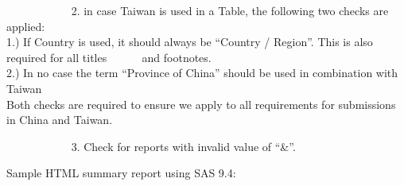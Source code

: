 \documentclass[
  letterpaper,
  DIV=11,
  numbers=noendperiod]{scrartcl}
\begin{document}
~~~~~~~~~~~ 2. in case Taiwan is used in a Table, the following two
checks are applied:\\
\hspace*{0.333em}\hspace*{0.333em}\hspace*{0.333em}\hspace*{0.333em}\hspace*{0.333em}\hspace*{0.333em}\hspace*{0.333em}\hspace*{0.333em}\hspace*{0.333em}\hspace*{0.333em}\hspace*{0.333em}
1.) If Country is used, it should always be ``Country / Region''. This
is also required for all titles ~~~~~ and footnotes.\\
\hspace*{0.333em}\hspace*{0.333em}\hspace*{0.333em}\hspace*{0.333em}\hspace*{0.333em}\hspace*{0.333em}\hspace*{0.333em}\hspace*{0.333em}\hspace*{0.333em}\hspace*{0.333em}\hspace*{0.333em}
2.) In no case the term ``Province of China'' should be used in
combination with Taiwan\\
\hspace*{0.333em}\hspace*{0.333em}\hspace*{0.333em}\hspace*{0.333em}\hspace*{0.333em}\hspace*{0.333em}\hspace*{0.333em}\hspace*{0.333em}\hspace*{0.333em}\hspace*{0.333em}\hspace*{0.333em}
Both checks are required to ensure we apply to all requirements for
submissions in China and Taiwan.

~~~~~~~~~~~ 3. Check for reports with invalid value of ``\&''.

Sample HTML summary report using SAS 9.4:
\end{document}
